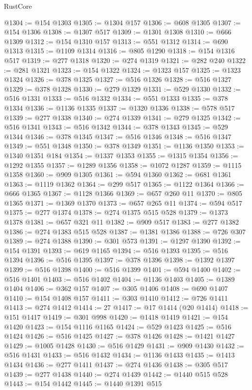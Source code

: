 \begin{lexlean}{RustCore}
\begin{coremodule}
@1304 := @154 @1303
@1305 := @1304 @157
@1306 := @608 @1305
@1307 := @154 @1306
@1308 := @1307 @517
@1309 := @1301 @1308
@1310 := @666 @1309
@1312 := @154 @1310 @157
@1313 := @551 @1312
@1314 := @690 @1313
@1315 := @1109 @1314
@1316 := @805 @1290
@1318 := @154 @1316 @517
@1319 := @277 @1318
@1320 := @274 @1319
@1321 := @282 @240
@1322 := @281 @1321
@1323 := @154 @1322
@1324 := @1323 @157
@1325 := @1323 @1324
@1326 := @378 @1325
@1327 := @516 @1326
@1328 := @516 @1327
@1329 := @378 @1328
@1330 := @279 @1329
@1331 := @529 @1330
@1332 := @516 @1331
@1333 := @516 @1332
@1334 := @551 @1333
@1335 := @378 @1334
@1336 := @1136 @1335
@1337 := @1320 @1336
@1338 := @578 @517
@1339 := @277 @1338
@1340 := @274 @1339
@1341 := @279 @1325
@1342 := @516 @1341
@1343 := @516 @1342
@1344 := @378 @1343
@1345 := @529 @1344
@1346 := @378 @1345
@1347 := @516 @1346
@1348 := @516 @1347
@1349 := @551 @1348
@1350 := @378 @1349
@1351 := @1136 @1350
@1353 := @1340 @1351 @184
@1354 := @1337 @1353
@1355 := @1315 @1354
@1356 := @1292 @1355
@1357 := @1289 @1356
@1358 := @1072 @1287
@1359 := @1115 @1358
@1360 := @909 @1305
@1361 := @594 @1360
@1362 := @681 @1361
@1363 := @1119 @1362
@1364 := @299 @517
@1365 := @1122 @1364
@1366 := @666 @1365
@1367 := @1128 @1366
@1369 := @657 @260 @11
@1370 := @805 @1365
@1371 := @1369 @1370
@1373 := @657 @265 @11
@1374 := @594 @517
@1375 := @277 @1374
@1378 := @274 @1375 @515 @528
@1379 := @1373 @1378
@1381 := @657 @321 @11
@1382 := @909 @517
@1383 := @277 @1382
@1386 := @274 @1383 @515 @528
@1387 := @1381 @1386
@1388 := @726 @307
@1389 := @274 @1388
@1390 := @301 @573
@1391 := @1297 @1390
@1392 := @154 @1391
@1393 := @619 @1165
@1394 := @516 @1393
@1395 := @516 @1394
@1396 := @516 @1395
@1397 := @378 @1396
@1398 := @1392 @1397
@1399 := @516 @1398
@1400 := @516 @1399
@1401 := @594 @1400
@1402 := @516 @1401
@1403 := @516 @1402
@1404 := @1136 @1403
@1405 := @1389 @1404
@1406 := @362 @157
@1407 := @305 @1406
@1408 := @690 @1407
@1410 := @154 @1408 @157
@1411 := @303 @1410
@1412 := @726 @1411
@1413 := @274 @1412
@1414 := 27
@1417 := @17 @1414 (@20 @1414)
@1418 := @151 @1417
@1419 := @301 @998
@1420 := @1418 @1419
@1421 := @154 @1420
@1423 := @154 @1116 @1165
@1424 := @529 @1423
@1425 := @516 @1424
@1426 := @516 @1425
@1427 := @378 @1426
@1428 := @1421 @1427
@1429 := @1005 @1428
@1430 := @516 @1429
@1431 := @909 @1430
@1432 := @516 @1431
@1433 := @516 @1432
@1434 := @1136 @1433
@1435 := @1413 @1434
@1436 := @277 @1411
@1437 := @274 @1436
@1438 := @305 @517
@1439 := @277 @1438
@1440 := @274 @1439
@1442 := @1440 @515 @528
@1443 := @154 @1442
@1445 := @1440 @1391 @515

\end{coremodule}
\end{lexlean}
